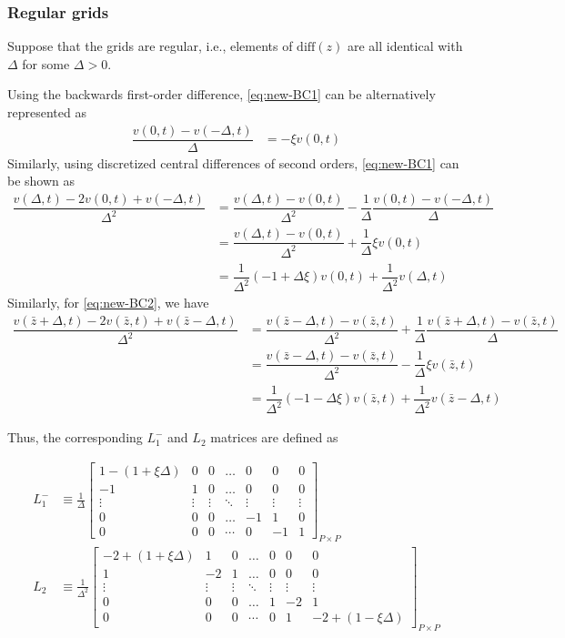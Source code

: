 \documentclass[11pt]{article}
\begin{document}
\subsubsection{Regular grids}
Suppose that the grids are regular, i.e., elements of $\text{diff}(z)$ are all identical with $\Delta$ for some $\Delta > 0$.

Using the backwards first-order difference, \eqref{eq:new-BC1} can be alternatively represented as
\begin{align}
\dfrac{v(0, t) - v(-\Delta, t)}{\Delta} &= - \xi v(0,t)
\end{align}
Similarly, using discretized central differences of second orders, \eqref{eq:new-BC1} can be shown as
\begin{align}
\dfrac{v (\Delta, t) - 2 v(0, t) + v(-\Delta, t)}{\Delta^2} &=   \dfrac{v(\Delta, t) - v(0, t)}{\Delta^2} - \dfrac{1}{\Delta}\dfrac{v (0, t) - v(-\Delta, t) }{\Delta}  \\
&= \dfrac{v(\Delta, t) - v(0, t)}{\Delta^2} + \dfrac{1}{\Delta} \xi v(0, t)  \\ 
&= \dfrac{1}{\Delta^2}  (- 1 + \Delta \xi) v(0,t)  + \dfrac{1}{\Delta^2}  v(\Delta, t)  
\end{align}
Similarly, for \eqref{eq:new-BC2}, we have
\begin{align}
\dfrac{v (\bar{z} + \Delta, t) - 2 v(\bar{z} , t) + v(\bar{z} -\Delta, t)}{\Delta^2} &=   \dfrac{v(\bar{z} - \Delta, t) - v(\bar{z}, t)}{\Delta^2} + \dfrac{1}{\Delta}\dfrac{ v(\bar{z}+\Delta, t) - v (\bar{z}, t) }{\Delta}  \\
&= \dfrac{v(\bar{z} - \Delta, t) - v(\bar{z}, t)}{\Delta^2}  - \dfrac{1}{\Delta} \xi v(\bar{z}, t)  \\ 
&= \dfrac{1}{\Delta^2}  (- 1 - \Delta \xi) v(\bar{z},t)  + \dfrac{1}{\Delta^2}  v(\bar{z} - \Delta, t)  
\end{align}

Thus, the corresponding $L_1^{-}$ and $L_2$ matrices are defined as 

\begin{align}
L_1^{-} &\equiv \frac{1}{\Delta}\begin{bmatrix}
1 - (1 + \xi \Delta) &0&0&\dots&0&0&0\\
-1&1&0&\dots&0&0&0\\
\vdots&\vdots&\vdots&\ddots&\vdots&\vdots&\vdots\\
0&0&0&\dots&-1&1&0\\
0&0&0&\cdots&0&-1&1
\end{bmatrix}_{P\times P}\label{eq:L-1-regular} \\
L_2 &\equiv \frac{1}{\Delta^2}\begin{bmatrix}
-2 + (1 + \xi\Delta) &1&0&\dots&0&0&0\\
1&-2&1&\dots&0&0&0\\
\vdots&\vdots&\vdots&\ddots&\vdots&\vdots&\vdots\\
0&0&0&\dots&1&-2&1\\
0&0&0&\cdots&0&1&-2 + (1- \xi\Delta)
\end{bmatrix}_{P\times P}\label{eq:L-2-regular}
\end{align}
\end{document}
